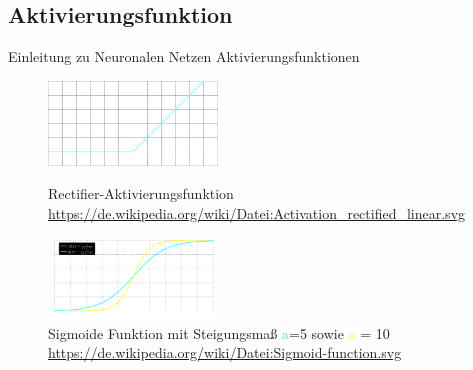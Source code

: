 \documentclass{beamer}
\begin{document}
\subsection{Aktivierungsfunktion}
\begin{frame}[t]{Einleitung zu Neuronalen Netzen}\vspace{4pt}
Aktivierungsfunktionen
\begin{figure}
    \centering
        \includegraphics[width=0.4\textwidth]{Activation_rectified_linear_invertiert.png}
		\tiny\caption{Rectifier-Aktivierungsfunktion \tiny\url{https://de.wikipedia.org/wiki/Datei:Activation_rectified_linear.svg}}
		\includegraphics[width=0.4\textwidth]{Sigmoid-function_invertiert.png}
		\tiny\caption{Sigmoide Funktion mit Steigungsmaß
		\textcolor{Turquoise}{a}=5 sowie
		\textcolor{yellow}{a} = 10 \tiny\url{https://de.wikipedia.org/wiki/Datei:Sigmoid-function.svg}}
\end{figure}
\end{frame}


    
\end{document}
